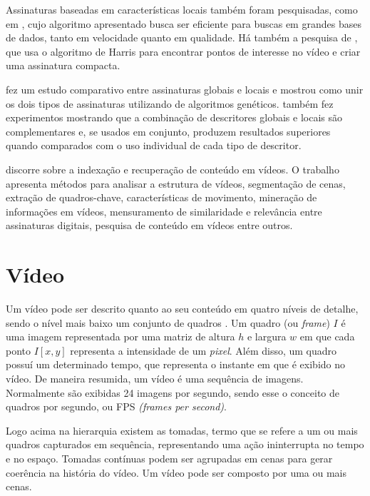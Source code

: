 Assinaturas baseadas em características locais também foram pesquisadas, como em \citeauthor{joly2007content}, cujo algoritmo apresentado busca ser eficiente para buscas em grandes bases de dados, tanto em velocidade quanto em qualidade. Há também a  pesquisa de \citeauthor{law2006robust}, que usa o algoritmo de Harris para encontrar pontos de interesse no vídeo e criar uma assinatura compacta.

\citeauthor{de2012combinaccao} fez um estudo comparativo entre assinaturas globais e locais e mostrou como unir os dois tipos de assinaturas utilizando de algoritmos genéticos. \citeauthor{de2012combinaccao} também fez experimentos mostrando que a combinação de descritores globais e locais são complementares e, se usados em conjunto, produzem resultados superiores quando comparados com o uso individual de cada tipo de descritor.

\citeauthor{hu2011survey} discorre sobre a indexação e recuperação de conteúdo em vídeos. O trabalho apresenta métodos para analisar a estrutura de vídeos, segmentação de cenas, extração de quadros-chave, características de movimento, mineração de informações em vídeos, mensuramento de similaridade e relevância entre assinaturas digitais, pesquisa de conteúdo em vídeos entre outros.


\section{Vídeo}
\label{sec:video}  

\textbf{}	Um vídeo pode ser descrito quanto ao seu conteúdo em quatro níveis de detalhe, sendo o nível mais baixo um conjunto de quadros \citeauthor{lienhart1997video}. Um quadro (ou \textit{frame}) $I$ é uma imagem representada por uma matriz de altura $h$ e largura $w$ em que cada ponto $I[x,y]$ representa a intensidade de um \textit{pixel}. Além disso, um quadro possuí um determinado tempo, que representa o instante em que é exibido no vídeo. De maneira resumida, um vídeo é uma sequência de imagens. Normalmente são exibidas 24 imagens por segundo, sendo esse o conceito de quadros por segundo, ou FPS \textit{(frames per second)}. 

	Logo acima na hierarquia existem as tomadas, termo que se refere a um ou mais quadros capturados em sequência, representando uma ação ininterrupta no tempo e no espaço. Tomadas contínuas podem ser agrupadas em cenas para gerar coerência na história do vídeo. Um vídeo pode ser composto por uma ou mais cenas.

